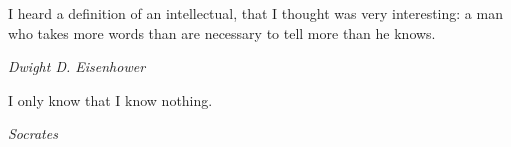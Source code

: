 



    \frontmatter


        \thispagestyle{empty}
        \epigraph{I heard a definition of an intellectual, that I thought was very interesting:
            a man who takes more words than are necessary to tell more than he knows.}{\textit{Dwight D. Eisenhower}}
        \epigraph{I only know that I know nothing.}{\textit{Socrates}}
        \restoregeometry

        \setlength{\cftaftertoctitleskip}{0.25cm}
        \setlength{\cftafterloftitleskip}{0.25cm}
        \setlength{\cftafterlottitleskip}{0.25cm}

        \tableofcontents
        \lstlistoflistings
        \listoftables
        \listoffigures




        \mainmatter

        
        
        
        
        
        

    \appendix
    
    

        \printbibliography[title = {Modify Me :P}]


